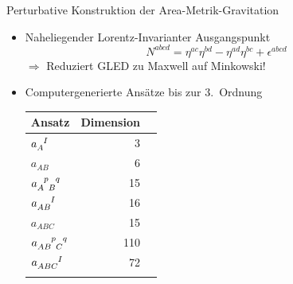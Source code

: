 \documentclass{beamer}
\begin{document}
    \begin{frame}{Perturbative Konstruktion der Area-Metrik-Gravitation}
        \begin{itemize}
            \item Naheliegender Lorentz-Invarianter Ausgangspunkt
            \[
                N^{abcd} = \eta^{ac} \eta^{bd} - \eta^{ad} \eta^{bc} + \epsilon^{abcd}
            \]
            $\Rightarrow$ Reduziert GLED zu Maxwell auf Minkowski!
            \item Computergenerierte Ansätze bis zur 3.\ Ordnung
            \footnotesize
            \begin{table}
                \centering
                \begin{tabular}{l r r}
                    \toprule
                    Ansatz                                            & Dimension \\
                    \midrule
                    $a_A^{\hphantom AI}$                              & 3         \\ \addlinespace[2pt]
                    $a_{AB}$                                          & 6         \\ \addlinespace[2pt]
                    $a_{A\hphantom pB}^{\hphantom Ap\hphantom Bq}$    & 15        \\ \addlinespace[2pt]
                    $a_{AB}^{\hphantom{AB}I}$                         & 16        \\ \addlinespace[2pt]
                    $a_{ABC}$                                         & 15        \\ \addlinespace[2pt]
                    $a_{AB\hphantom pC}^{\hphantom{AB}p\hphantom Cq}$ & 110       \\ \addlinespace[2pt]
                    $a_{ABC}^{\hphantom{ABC}I}$                       & 72        \\ \addlinespace[2pt]
                    \bottomrule
                \end{tabular}\label{tab:ansaetze}
            \end{table}
        \end{itemize}
    \end{frame}
\end{document}
